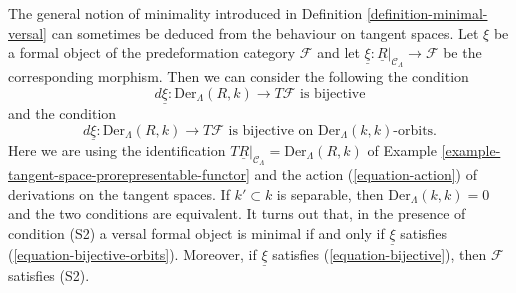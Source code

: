 \noindent
The general notion of minimality introduced in
Definition \ref{definition-minimal-versal}
can sometimes be deduced from the behaviour on tangent spaces.
Let $\xi$ be a formal object of the predeformation category
$\mathcal{F}$ and let
$\underline{\xi} : \underline{R}|_{\mathcal{C}_\Lambda} \to \mathcal{F}$
be the corresponding morphism. Then we can consider the following
the condition
\begin{equation}
\label{equation-bijective}
d\underline{\xi} : \text{Der}_\Lambda(R, k) \to T\mathcal{F} 
\text{ is bijective}
\end{equation}
and the condition
\begin{equation}
\label{equation-bijective-orbits}
d\underline{\xi} : \text{Der}_\Lambda(R, k) \to T\mathcal{F} 
\text{ is bijective on }\text{Der}_\Lambda(k, k)\text{-orbits.}
\end{equation}
Here we are using the identification
$T\underline{R}|_{\mathcal{C}_\Lambda} = \text{Der}_\Lambda(R, k)$ of
Example \ref{example-tangent-space-prorepresentable-functor}
and the action (\ref{equation-action}) of derivations
on the tangent spaces. If $k' \subset k$ is separable, then
$\text{Der}_\Lambda(k, k) = 0$ and the two conditions are equivalent.
It turns out that, in the presence of condition (S2) a versal formal
object is minimal if and only if $\underline{\xi}$ satisfies
(\ref{equation-bijective-orbits}).
Moreover, if $\underline{\xi}$ satisfies (\ref{equation-bijective}), then
$\mathcal{F}$ satisfies (S2).